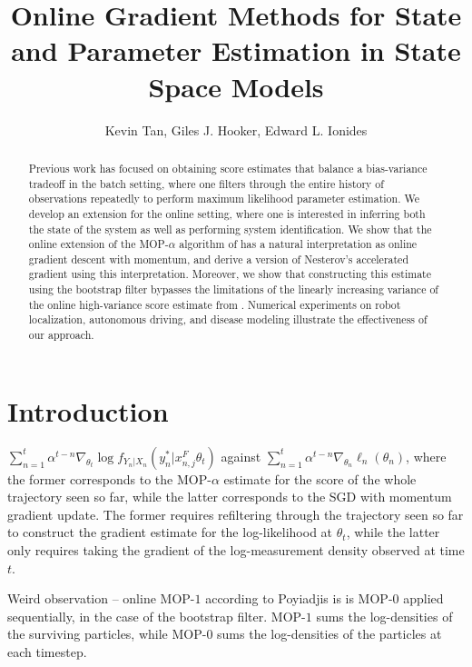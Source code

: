 \documentclass{article}
\title{Online Gradient Methods for State and Parameter Estimation in State Space Models}
\author{Kevin Tan, Giles J. Hooker, Edward L. Ionides}
\date{}
\begin{document}
\maketitle
\begin{abstract}

Previous work has focused on obtaining score estimates that balance a bias-variance tradeoff in the batch setting, where one filters through the entire history of observations repeatedly to perform maximum likelihood parameter estimation. We develop an extension for the online setting, where one is interested in inferring both the state of the system as well as performing system identification. We show that the online extension of the MOP-$\alpha$ algorithm of \cite{tan2024acceleratedinferencepartiallyobserved} has a natural interpretation as online gradient descent with momentum, and derive a version of Nesterov's accelerated gradient using this interpretation. Moreover, we show that constructing this estimate using the bootstrap filter bypasses the limitations of the linearly increasing variance of the online high-variance score estimate from \cite{poyiadjis11}. Numerical experiments on robot localization, autonomous driving, and disease modeling illustrate the effectiveness of our approach.
\end{abstract}

\section{Introduction}


$\sum_{n=1}^t \alpha^{t-n}  \nabla_{\theta_t} \log f_{Y_n|X_n}(y_n^*|x_{n,j}^F\theta_t)$ against $\sum_{n=1}^t \alpha^{t-n} \nabla_{\theta_n} \ell_n(\theta_n)$, where the former corresponds to the MOP-$\alpha$ estimate for the score of the whole trajectory seen so far, while the latter corresponds to the SGD with momentum gradient update. The former requires refiltering through the trajectory seen so far to construct the gradient estimate for the log-likelihood at $\theta_t$, while the latter only requires taking the gradient of the log-measurement density observed at time $t$.


Weird observation -- online MOP-$1$ according to Poyiadjis is is MOP-$0$ applied sequentially, in the case of the bootstrap filter. MOP-$1$ sums the log-densities of the surviving particles, while MOP-$0$ sums the log-densities of the particles at each timestep. 





\appendix
\renewcommand{\thefigure}{A\arabic{figure}}
\setcounter{figure}{0}
\end{document}
